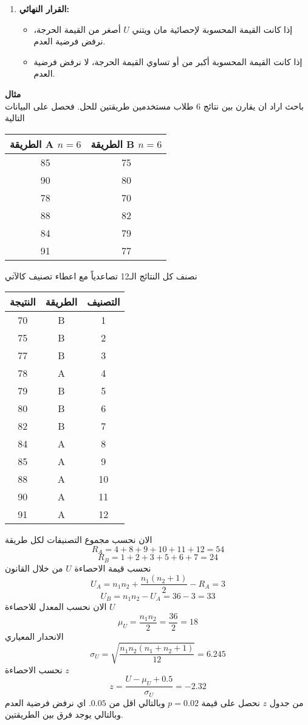 \begin{enumerate}
	\item \textbf{القرار النهائي:}
	\begin{itemize}
		\item إذا كانت القيمة المحسوبة لإحصائية مان ويتني \( U \) أصغر من القيمة الحرجة، نرفض فرضية العدم.
		\item إذا كانت القيمة المحسوبة أكبر من أو تساوي القيمة الحرجة، لا نرفض فرضية العدم.
	\end{itemize}
\end{enumerate}

\noindent
\textbf{مثال}\\
باحث اراد ان يقارن بين نتائج 6 طلاب مستخدمين طريقتين للحل. فحصل على البيانات التالية

\begin{table}[H]
	\centering
	\begin{tabular}{|c|c|}
		\hline
		الطريقة A $n=6$ & الطريقة B $n=6$\\
		\hline
		85 & 75 \\
		90 & 80\\
		78 & 70\\
		88 & 82\\
		84 & 79\\
		91 & 77\\
		\hline
	\end{tabular}
\end{table}
نصنف كل النتائج الـ12 تصاعدياً مع اعطاء تصنيف كالآتي
\begin{table}[H]
	\centering
	\begin{tabular}{|c|c|c|}
		\hline
		النتيجة & الطريقة & التصنيف \\
		\hline
		70 & B&1\\
		75&B &2\\
		77&B&3\\
		78&A&4\\
		79&B&5\\
		80&B&6\\
		82&B&7\\
		84&A&8\\
		85&A&9\\
		88&A&10\\
		90&A&11\\
		91&A&12\\
		\hline
	\end{tabular}
\end{table}
الان نحسب مجموع التصنيفات لكل طريقة
\[
R_A = 4+8+9+10+11+12 = 54
\]
\[
R_B = 1+2+3+5+6+7 = 24
\]
نحسب قيمة الاحصاءة $U$ من خلال القانون
\[
U_A = n_1 n_2 + \frac{n_1(n_2+1)}{2} - R_A = 3
\]
\[
U_B = n_1 n_2 - U_A = 36 - 3 = 33
\]
الان نحسب المعدل للاحصاءة $U$
\[
\mu_U = \frac{n_1n_2}{2} = \frac{36}{2} = 18
\]
الانحدار المعياري
\[
\sigma_U = \sqrt{\frac{n_1n_2(n_1+n_2+1)}{12}} = 6.245
\]
نحسب الاحصاءة $z$
\[
z = \frac{U-\mu_U + 0.5}{\sigma_U} = -2.32
\]
من جدول $z$ نحصل على قيمة $p = 0.02$ وبالتالي اقل من $0.05$. اي نرفض فرضية العدم وبالتالي يوجد فرق بين الطريقتين.

